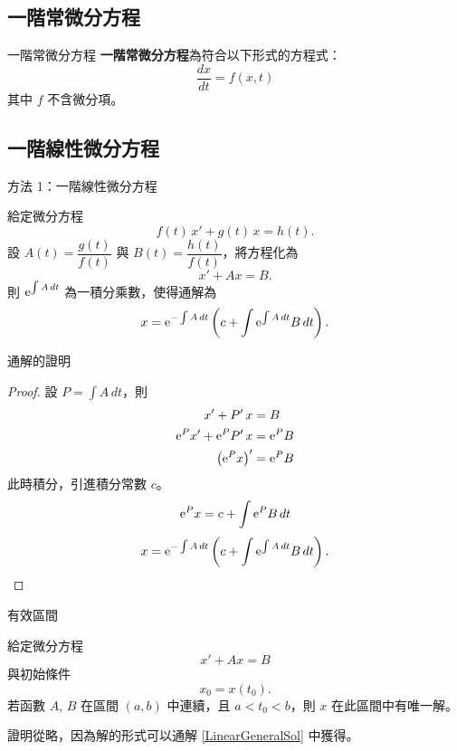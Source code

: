 \documentclass{beamer}
\newcommand  {\e}{\textup e}
\theoremstyle{remark}
\begin{document}
\begin{CJK}{UTF8}{bsmi}
\section[一階 ODE]{一階常微分方程}
\begin{frame}{一階常微分方程}
  \textbf{一階常微分方程}為符合以下形式的方程式：
  \[ \frac{dx}{dt} = f(x,t) \]
  其中 $f$ 不含微分項。
\end{frame}

\subsection[線性]{一階線性微分方程}
\begin{frame}{方法 1：一階線性微分方程}
  \begin{theorem}
    給定微分方程
    \[f(t)\,x' + g(t)\,x = h(t).\]
    設 $A(t) = \dfrac{g(t)}{f(t)}$ 與 $B(t) = \dfrac{h(t)}{f(t)}$，將方程化為
    \[x' + Ax = B.\]
    則 $\e^{\int A\,dt}$ 為一積分乘數，使得通解為
    \[x = \e^{-\int A\,dt} \left( c + \int \e^{\int A\,dt} B\,dt \right).\]
  \end{theorem}
\end{frame}

\begin{frame}{通解的證明}
  \begin{proof}
    設 $P = \int A\,dt$，則
    \begin{align*}
      x' + P'\,x &= B \\
      \e^P x' + \e^P P'\,x &= \e^P B \\
      \left( \e^P x \right)' &= \e^P B
    \end{align*}
    此時積分，引進積分常數 $c$。
    \[ \e^P x = c + \int \e^P B\,dt \]
    \begin{equation}
      x = \e^{-\int A\,dt} \left( c + \int \e^{\int A\,dt} B\,dt \right).
      \qedhere \label{LinearGeneralSol}
    \end{equation}
  \end{proof}
\end{frame}

\begin{frame}{有效區間}
  \begin{theorem}
    給定微分方程
    \[ x' + Ax = B \]
    與初始條件
    \[ x_0 = x(t_0).\]
    若函數 $A$, $B$ 在區間 $(a, b)$ 中連續，且 $a < t_0 < b$，則 $x$
    在此區間中有唯一解。
  \end{theorem}

  證明從略，因為解的形式可以通解 \eqref{LinearGeneralSol} 中獲得。
\end{frame}


\end{CJK}
\end{document}
